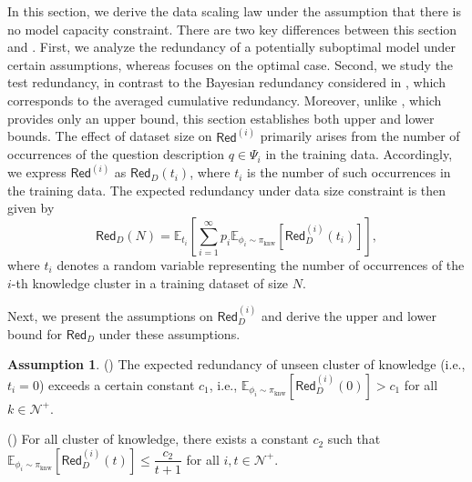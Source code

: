 \documentclass[11pt]{article}
\theoremstyle{plain}
\theoremstyle{definition}
\newtheorem{assumption}[theorem]{Assumption}
\newcommand{\basemeasure}{\pi_{\text{knw}}}
\newcommand{\questionset}{\Psi}
\newcommand{\ferror}{\mathsf{Red}}
\newcommand{\dataerror}{\mathsf{Red}_D}
\newcommand{\testdataerror}{\mathsf{Red}_D}
\begin{document}
In this section, we derive the data scaling law under the assumption that there is no model capacity constraint. There are two key differences between this section and . First, we analyze the redundancy of a potentially suboptimal model under certain assumptions, whereas  focuses on the optimal case. Second, we study the test redundancy, in contrast to the Bayesian redundancy considered in , which corresponds to the averaged cumulative redundancy.
Moreover, unlike , which provides only an upper bound, this section establishes both upper and lower bounds.
The effect of dataset size on \( \ferror^{(i)} \) primarily arises from the number of occurrences of the question description \( q\in \questionset_i \) in the training data. Accordingly, we express \( \ferror^{(i)} \) as $\dataerror(t_i)$, where $t_i$ is the number of such occurrences
in the training data. 
The expected redundancy under data size constraint is then given by
\[ \testdataerror(N) = \mathbb{E}_{t_i}\left[\sum_{i=1}^{\infty} p_i \mathbb{E}_{\phi_i \sim \basemeasure}\left[\dataerror^{(i)}(t_i)\right] \right],\]
where \( t_i \) denotes a random variable representing the number of occurrences of the \( i \)-th knowledge cluster in a training dataset of size \( N \).






Next, we present the assumptions on \( \dataerror^{(i)} \) and derive the upper and lower bound for \( \testdataerror \) under these assumptions.

\begin{assumption}
\label{ass:data law}
(\uppercase\expandafter{})
The expected redundancy of unseen cluster of knowledge (i.e., $t_i=0$) exceeds a certain constant $c_1$, i.e., $\mathbb{E}_{\phi_i\sim \basemeasure}\left[\dataerror^{(i)}(0)\right]>c_1$ for all $k\in \mathcal{N}^+$.

(\uppercase\expandafter{})
For all cluster of knowledge, there exists a constant $c_2$ such that 
 $\mathbb{E}_{\phi_i\sim \basemeasure}\left[\dataerror^{(i)}(t)\right]\le \dfrac{c_2}{t+1}$ for all $i,t\in \mathcal{N}^+$.
\end{assumption}
\end{document}
